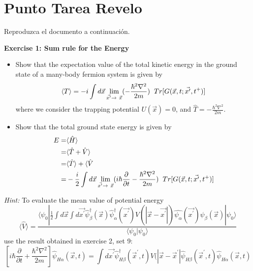 \documentclass[10pt,onecolumn,letterpaper]{article}
\begin{document}
\section{Punto Tarea Revelo}
Reproduzca el documento a continuación.

\begin{center}
\textbf{Exercise 1: Sum rule for the Energy}
\end{center}
\begin{itemize}
\item Show that the expectation value of the total kinetic energy in the ground state of a many-body fermion system is given by
\begin{equation}
\langle T \rangle =-i\int d \vec{x} \lim_{\vec{x^{\prime}}\to\ \vec{x}} (-\frac{\hbar^{2}\nabla^{2}}{2m})\hspace{0.2cm} Tr[G(\vec{x},t;\vec{x^{\prime}},t^{+})]
\end{equation}
where we consider the trapping potential $U(\vec{x})=0$, and $\hat{T}=-\frac{\hbar^{2}\nabla^{2}}{2m}$.
\item Show that the total ground state energy is given by
\begin{eqnarray}
E=& \langle \hat{H} \rangle \nonumber \\
 =& \langle \hat{T} + \hat{V} \rangle \nonumber \\
 =& \langle \hat{T} \rangle + \langle \hat{V}  \nonumber \\
 =& -\frac{i}{2} \int d \vec{x} \lim_{\vec{x^{\prime}}\to\ \vec{x}} (i\hbar\frac{\partial}{\partial t}-\frac{\hbar^{2}\nabla^{2}}{2m})\hspace{0.2cm} Tr[G(\vec{x},t;\vec{x^{\prime}},t^{+})] 
\end{eqnarray}
\end{itemize}
\textit{Hint:} To evaluate the mean value of potential energy
\begin{equation}
\langle \hat{V} \rangle =\frac{\langle \psi_0 |\frac{1}{2} \int d \vec{x}
\int d \vec{x^{\prime}}\hat{\psi}_\beta^{\dagger}
(\vec{x}) \hat{\psi}_{\alpha}^{\dagger}(\vec{x^{\prime}}) V
(|\vec{x}-\vec{x^{\prime}}|)  \hat{\psi_\alpha }
(\vec{x^{\prime}}) \psi_\beta (\vec{x})|\psi_0\rangle}
{\langle\psi_0|\psi_0\rangle}
\end{equation}
use the result obtained in exercise 2, set 9:
\begin{equation}
\left[i\hbar\frac{\partial}{\partial t}+\frac{\hbar^{2}\nabla^{2}}{2m}\right]\hat{\psi}_{H\alpha} (\vec{x},t)=\int d\vec{x^{\prime}} \hat{\psi}_{H\beta}^{\dagger} (\vec{x}^{\prime},t)V(|\vec{x}-\vec{x}^{\prime}|\hat{\psi}_{H\beta}(\vec{x}^{\prime},t)\hat{\psi}_{H\alpha}(\vec{x},t)
\end{equation}
\end{document}

